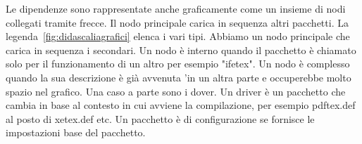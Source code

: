 Le dipendenze sono rappresentate anche graficamente come un insieme di nodi  
collegati tramite frecce. Il nodo principale  carica in sequenza altri pacchetti. La legenda~\vref{fig:didascaliagrafici} elenca i vari tipi. Abbiamo un nodo principale che carica  in sequenza i secondari. Un nodo è interno quando il pacchetto è chiamato solo per il funzionamento di un altro per esempio "ifetex". Un nodo è complesso quando la sua descrizione è già avvenuta 'in un altra parte e occuperebbe molto spazio nel grafico. Una caso a parte sono i dover. Un driver è un pacchetto che cambia in base al contesto in cui avviene la compilazione, per esempio pdftex.def al posto di xetex.def  etc.  Un pacchetto è di configurazione se fornisce le impostazioni base del pacchetto.  